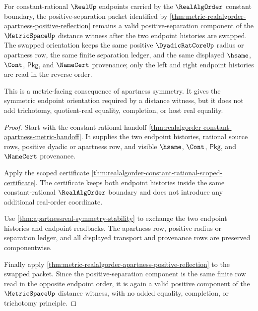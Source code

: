 \begin{theorem}
\label{thm:realalgorder-apartness-metric-symmetric-separation}
For constant-rational $\RealUp$ endpoints carried by the $\RealAlgOrder$
constant boundary, the positive-separation packet identified by
\autoref{thm:metric-realalgorder-apartness-positive-reflection} remains a valid
positive-separation component of the $\MetricSpaceUp$ distance witness after
the two endpoint histories are swapped. The swapped orientation keeps the same
positive $\DyadicRatCoreUp$ radius or apartness row, the same finite separation
ledger, and the same displayed $\hsame$, $\Cont$, $\mathsf{Pkg}$, and
$\NameCert$ provenance; only the left and right endpoint histories are read in
the reverse order.

This is a metric-facing consequence of apartness symmetry. It gives the
symmetric endpoint orientation required by a distance witness, but it does not
add trichotomy, quotient-real equality, completion, or host real equality.
\end{theorem}
\begin{proof}
Start with the constant-rational handoff
\autoref{thm:realalgorder-constant-apartness-metric-handoff}. It supplies the
two endpoint histories, rational source rows, positive dyadic or apartness row,
and visible $\hsame$, $\Cont$, $\mathsf{Pkg}$, and $\NameCert$ provenance.

Apply the scoped certificate
\autoref{thm:realalgorder-constant-rational-scoped-certificate}. The certificate
keeps both endpoint histories inside the same constant-rational
$\RealAlgOrder$ boundary and does not introduce any additional real-order
coordinate.

Use \autoref{thm:apartnessreal-symmetry-stability} to exchange the two
endpoint histories and endpoint readbacks. The apartness row, positive radius
or separation ledger, and all displayed transport and provenance rows are
preserved componentwise.

Finally apply
\autoref{thm:metric-realalgorder-apartness-positive-reflection} to the swapped
packet. Since the positive-separation component is the same finite row read in
the opposite endpoint order, it is again a valid positive component of the
$\MetricSpaceUp$ distance witness, with no added equality, completion, or
trichotomy principle.
\end{proof}

